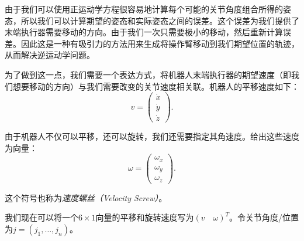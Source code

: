 由于我们可以使用正运动学方程很容易地计算每个可能的关节角度组合所得的姿态，所以我们可以计算期望的姿态和实际姿态之间的误差。这个误差为我们提供了末端执行器需要移动的方向。由于我们一次只需要极小的移动，然后重新计算误差。因此这是一种有吸引力的方法用来生成将操作臂移动到我们期望位置的轨迹，从而解决逆运动学问题。



为了做到这一点，我们需要一个表达方式，将机器人末端执行器的期望速度（即我们想要移动的方向）与我们需要改变的关节速度相关联。机器人的平移速度如下：
\begin{equation}
v=\left(\begin{array}{c}
\dot{x}\\
\dot{y}\\
\dot{z}
\end{array}
\right).
\end{equation}


由于机器人不仅可以平移，还可以旋转，我们还需要指定其角速度。给出这些速度为向量：
\begin{equation}
\omega=\left(\begin{array}{c}
\omega_x\\
\omega_y\\
\omega_z
\end{array}
\right).
\end{equation}


这个符号也称为\emph{速度螺丝（Velocity Screw）}。


我们现在可以将一个$6\times 1$向量的平移和旋转速度写为$(v\quad \omega)^T$。令关节角度/位置为$ j=(j_1,\ldots,j_n)$。


